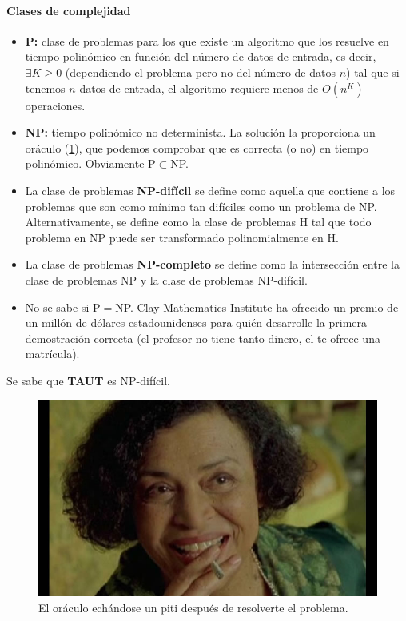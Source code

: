 \paragraph{Clases de complejidad}
\begin{itemize}
	\item \textbf{P:} clase de problemas para los que existe un algoritmo que los resuelve en tiempo polinómico en función del número de datos de entrada, es decir, $\exists K\ge 0$ (dependiendo el problema pero no del número de datos $n$) tal que si tenemos $n$ datos de entrada, el algoritmo requiere menos de $O(n^K)$ operaciones.
	\item \textbf{NP:} tiempo polinómico no determinista. La solución la proporciona un oráculo (\ref{fig:oraculo}), que podemos comprobar que es correcta (o no) en tiempo polinómico. Obviamente P$\subset$NP.
		\item La clase de problemas \textbf{NP-difícil} se define como aquella que contiene a los problemas que son como mínimo tan difíciles como un problema de NP. Alternativamente, se define como la clase de problemas H tal que todo problema en NP puede ser transformado polinomialmente en H.
	\item La clase de problemas \textbf{NP-completo} se define como la intersección entre la clase de problemas NP y la clase de problemas NP-difícil.
	\item No se sabe si P$=$NP. Clay Mathematics Institute ha ofrecido un premio de un millón de dólares estadounidenses para quién desarrolle la primera demostración correcta (el profesor no tiene tanto dinero, el te ofrece una matrícula).
\end{itemize}
Se sabe que \textbf{TAUT} es NP-difícil.

\begin{figure}[h]
	\centering
	\includegraphics[width=\linewidth/2]{img/oraculo.jpg}
	\caption{El oráculo echándose un piti después de resolverte el problema.}
	\label{fig:oraculo}
\end{figure}

